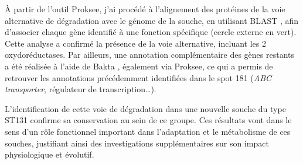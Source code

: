 À partir de l'outil Proksee, j'ai procédé à l'alignement des protéines de la voie alternative de dégradation avec le génome de la souche, en utilisant BLAST \cite{altschul_basic_1990}, afin d'associer chaque gène identifié à une fonction spécifique (cercle externe en vert). Cette analyse a confirmé la présence de la voie alternative, incluant les 2 oxydoréductases. Par ailleurs, une annotation complémentaire des gènes restants a été réalisée à l'aide de Bakta \cite{schwengers_bakta_2021}, également via Proksee, ce qui a permis de retrouver les annotations précédemment identifiées dans le spot 181 (\textit{ABC transporter}, régulateur de transcription\dots).

L'identification de cette voie de dégradation dans une nouvelle souche du type ST131 confirme sa conservation au sein de ce groupe. Ces résultats vont dans le sens d'un rôle fonctionnel important dans l'adaptation et le métabolisme de ces souches, justifiant ainsi des investigations supplémentaires sur son impact physiologique et évolutif.

